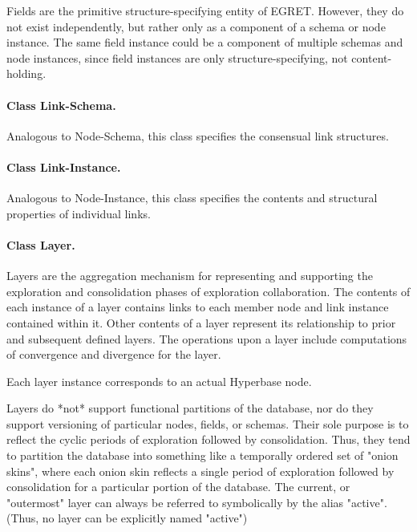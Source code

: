 Fields are the primitive structure-specifying entity of EGRET.
However, they do not exist independently, but rather only as a
component of a schema or node instance.  The same field instance could
be a component of multiple schemas and node instances, since field
instances are only structure-specifying, not content-holding.


\paragraph {Class Link-Schema.}

Analogous to Node-Schema, this class specifies the consensual link
structures. 

\paragraph{Class Link-Instance.}

Analogous to Node-Instance, this class specifies the contents and 
structural properties of individual links. 


\paragraph {Class Layer.}

Layers are the aggregation mechanism for representing and supporting
the exploration and consolidation phases of exploration collaboration.
The contents of each instance of a layer contains links to each member
node and link instance contained within it. Other
contents of a layer represent its relationship to prior and subsequent
defined layers.  The operations upon a layer include computations of
convergence and divergence for the layer.

Each layer instance corresponds to an actual Hyperbase node. 

Layers do *not* support functional partitions of the database, nor do
they support versioning of particular nodes, fields, or schemas.
Their sole purpose is to reflect the cyclic periods of exploration
followed by consolidation.  Thus, they tend to partition the database
into something like a temporally ordered set of "onion skins", where
each onion skin reflects a single period of exploration followed by
consolidation for a particular portion of the database. The current,
or "outermost" layer can always be referred to symbolically by the
alias "active". (Thus, no layer can be explicitly named "active")

